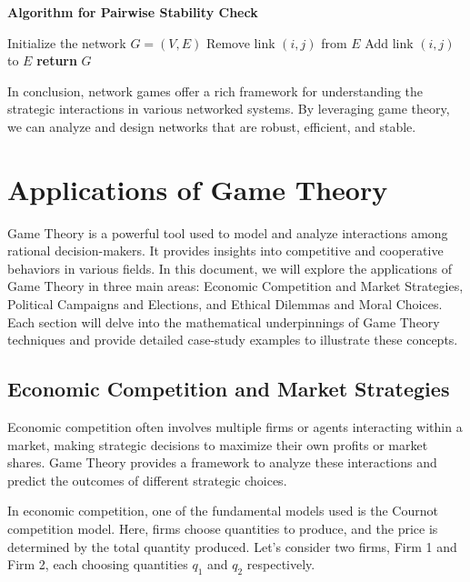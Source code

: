 \documentclass[12pt]{book} %
\begin{document}
\textbf{Algorithm for Pairwise Stability Check}
\begin{algorithm}
\caption{Pairwise Stability Check}
\begin{algorithmic}[1]
\State Initialize the network $G = (V, E)$
            \State Remove link $(i, j)$ from $E$
        \EndIf
    \Else
            \State Add link $(i, j)$ to $E$
        \EndIf
    \EndIf
\EndFor
\State \textbf{return} $G$
\end{algorithmic}
\end{algorithm}
\FloatBarrier

In conclusion, network games offer a rich framework for understanding the strategic interactions in various networked systems. By leveraging game theory, we can analyze and design networks that are robust, efficient, and stable.


\section{Applications of Game Theory}
Game Theory is a powerful tool used to model and analyze interactions among rational decision-makers. It provides insights into competitive and cooperative behaviors in various fields. In this document, we will explore the applications of Game Theory in three main areas: Economic Competition and Market Strategies, Political Campaigns and Elections, and Ethical Dilemmas and Moral Choices. Each section will delve into the mathematical underpinnings of Game Theory techniques and provide detailed case-study examples to illustrate these concepts.

\subsection{Economic Competition and Market Strategies}
Economic competition often involves multiple firms or agents interacting within a market, making strategic decisions to maximize their own profits or market shares. Game Theory provides a framework to analyze these interactions and predict the outcomes of different strategic choices.

In economic competition, one of the fundamental models used is the Cournot competition model. Here, firms choose quantities to produce, and the price is determined by the total quantity produced. Let's consider two firms, Firm 1 and Firm 2, each choosing quantities \( q_1 \) and \( q_2 \) respectively.
\end{document}
